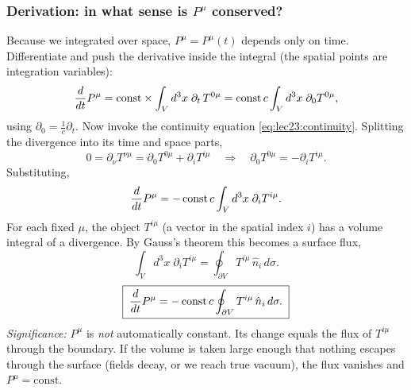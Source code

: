 \subsubsection*{Derivation: in what sense is $P^\mu$ conserved?}
Because we integrated over space, $P^\mu=P^\mu(t)$ depends only on time. Differentiate and
push the derivative inside the integral (the spatial points are integration variables):
\begin{equation}\label{eq:lec23:dPdt-1}
  \frac{d}{dt} P^\mu=\text{const}\times\int_V d^3x\;\partial_t\,T^{0\mu}
           =\text{const}\,c\int_V d^3x\;\partial_0 T^{0\mu},
\end{equation}
using $\partial_0=\tfrac1c\partial_t$. Now invoke the continuity equation
\eqref{eq:lec23:continuity}. Splitting the divergence into its time and space parts,
\begin{equation}\label{eq:lec23:split}
  0=\partial_\nu T^{\nu\mu}=\partial_0 T^{0\mu}+\partial_i T^{i\mu}
  \quad\Longrightarrow\quad
  \partial_0 T^{0\mu}=-\partial_i T^{i\mu}.
\end{equation}
Substituting,
\begin{equation}\label{eq:lec23:dPdt-2}
  \frac{d}{dt} P^\mu=-\,\text{const}\,c\int_V d^3x\;\partial_i T^{i\mu}.
\end{equation}
For each fixed $\mu$, the object $T^{i\mu}$ (a vector in the spatial index $i$) has a
volume integral of a divergence. By Gauss's theorem this becomes a surface flux,
\begin{equation}\label{eq:lec23:gauss}
  \int_V d^3x\;\partial_i T^{i\mu}
  =\oint_{\partial V} T^{i\mu}\,\hat n_i\,d\sigma .
\end{equation}
\begin{equation}\label{eq:lec23:conservation}
  \boxed{\;\frac{d}{dt} P^\mu=-\,\text{const}\,c\oint_{\partial V} T^{i\mu}\,\hat n_i\,d\sigma .\;}
\end{equation}
\textit{Significance:} $P^\mu$ is \emph{not} automatically constant. Its change equals the
flux of $T^{i\mu}$ through the boundary. If the volume is taken large enough that nothing
escapes through the surface (fields decay, or we reach true vacuum), the flux vanishes and
$P^\mu=\text{const}$.


